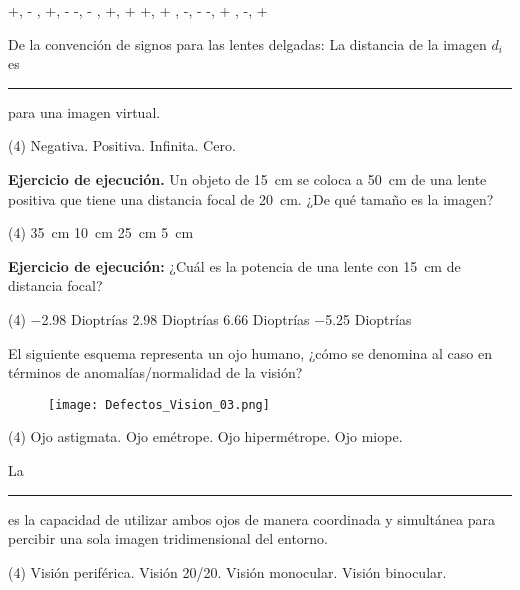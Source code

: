 \documentclass[12pt, letter]{exam}
\begin{document}
\begin{questions}
\begin{tasks}
        \task +, - , +, - 
        \task -, - , +, + 
        \task +, + , -, - 
        \task -, + , -, + 
    \end{tasks}
    \question De la convención de signos para las lentes delgadas:  La distancia de la imagen $d_{i}$ es \rule{2cm}{0.1mm} para una imagen virtual.
    \begin{tasks}(4)
        \task Negativa.
        \task Positiva.
        \task Infinita.
        \task Cero.
    \end{tasks}
    \question \textbf{Ejercicio de ejecución. } Un objeto de \SI{15}{\centi\meter} se coloca a \SI{50}{\centi\meter} de una lente positiva que tiene una distancia focal de \SI{20}{\centi\meter}. ¿De qué tamaño es la imagen?
    \begin{tasks}(4)
        \task \SI{35}{\centi\meter}
        \task \SI{10}{\centi\meter}
        \task \SI{25}{\centi\meter}
        \task \SI{5}{\centi\meter}
    \end{tasks}
    \question \textbf{Ejercicio de ejecución: } ¿Cuál es la potencia de una lente con \SI{15}{\centi\meter} de distancia focal?
    \begin{tasks}(4)
        \task \num{-2.98} Dioptrías
        \task \num{2.98} Dioptrías
        \task \num{6.66} Dioptrías
        \task \num{-5.25} Dioptrías
    \end{tasks}
    \question El siguiente esquema representa un ojo humano, ¿cómo se denomina al caso en términos de anomalías/normalidad de la visión?
    \begin{figure}[H]
        \centering
        \texttt{[image: Defectos\_Vision\_03.png]}
    \end{figure}
    \begin{tasks}(4)
        \task Ojo astigmata.
        \task Ojo emétrope.
        \task Ojo hipermétrope.
        \task Ojo miope.
    \end{tasks}
    \question  La \rule{2cm}{0.1mm} es la capacidad de utilizar ambos ojos de manera coordinada y simultánea para percibir una sola imagen tridimensional del entorno.
    \begin{tasks}(4)
        \task Visión periférica.
        \task Visión 20/20.
        \task Visión monocular.
        \task Visión binocular.
    \end{tasks}
\end{questions}
\end{document}
